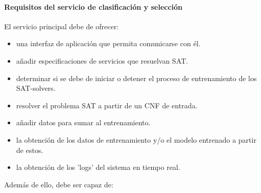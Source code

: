 \documentclass[11pt]{article}
\begin{document}
		\paragraph{Requisitos del servicio de clasificación y selección}
			El servicio principal debe de ofrecer:
			\begin{itemize}
				\item una interfaz de aplicación que permita comunicarse con él.
				\item añadir especificaciones de servicios que resuelvan SAT.
				\item determinar si se debe de iniciar o detener el proceso de entrenamiento de los SAT-solvers.
				\item resolver el problema SAT a partir de un CNF de entrada.
				\item añadir datos para sumar al entrenamiento.
				\item la obtención de los datos de entrenamiento y/o el modelo entrenado a partir de estos.
				\item la obtención de los 'logs' del sistema en tiempo real.
			\end{itemize}
			Además de ello, debe ser capaz de:
\end{document}
